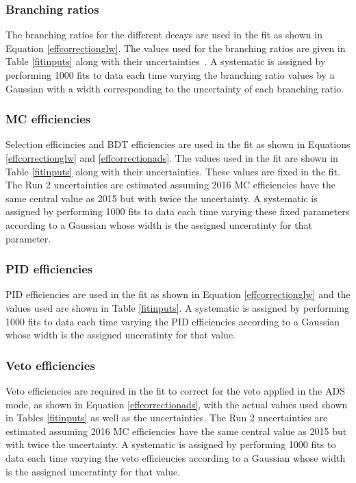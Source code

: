 \subsubsection{Branching ratios}

The branching ratios for the different \D decays are used in the \CP fit as shown in Equation \ref{effcorrectionglw}. The values used for the branching ratios are given in Table \ref{fitinputs} along with their uncertainties~\cite{PDG2014}. A systematic is assigned by performing 1000 fits to data each time varying the branching ratio values by a Gaussian with a width corresponding to the uncertainty of each branching ratio.

\subsubsection{MC efficiencies}

Selection efficincies and BDT efficiencies are used in the \CP fit as shown in Equations \ref{effcorrectionglw} and \ref{effcorrectionads}. The values used in the \CP fit are shown in Table \ref{fitinputs} along with their uncertainties. These values are fixed in the \CP fit. The Run 2 uncertainties are estimated assuming 2016 MC efficiencies have the same central value as 2015 but with twice the uncertainty.  A systematic is assigned by performing 1000 fits to data each time varying these fixed parameters according to a Gaussian whose width is the assigned unceratinty for that parameter.

\subsubsection{PID efficiencies}

PID efficiencies are used in the \CP fit as shown in Equation \ref{effcorrectionglw} and the values used are shown in Table \ref{fitinputs}. A systematic is assigned by performing 1000 fits to data each time varying the PID efficiencies according to a Gaussian whose width is the assigned unceratinty for that value.

\subsubsection{Veto efficiencies}

Veto efficiencies are required in the \CP fit to correct for the veto applied in the ADS mode, as shown in Equation \ref{effcorrectionads}, with the actual values used shown in Tables \ref{fitinputs} as well as the uncertainties. The Run 2 uncertainties are estimated assuming 2016 MC efficiencies have the same central value as 2015 but with twice the uncertainty. A systematic is assigned by performing 1000 fits to data each time varying the veto efficiencies according to a Gaussian whose width is the assigned unceratinty for that value.

